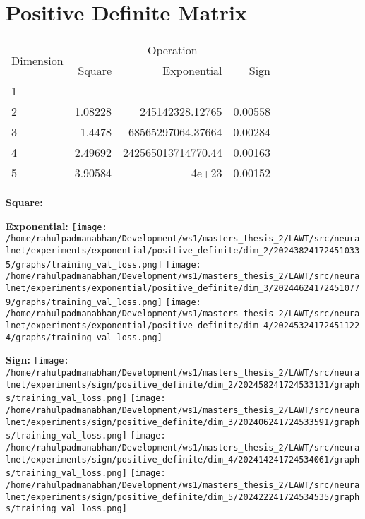 \documentclass{article}
\begin{document}
\pagebreak
\section{Positive Definite Matrix}
\begin{tabular}{@{}lrrr@{}}
\toprule
\multirow{2}{*}{Dimension} & \multicolumn{3}{c}{Operation} \\
\cmidrule(l){2-4}
& Square & Exponential & Sign \\
\midrule
1 & & & \\
2 & 1.08228 & 245142328.12765 & 0.00558 \\
3 & 1.4478 & 68565297064.37664 & 0.00284 \\
4 & 2.49692 & 242565013714770.44 & 0.00163 \\
5 & 3.90584 & 4e+23 & 0.00152 \\
\bottomrule
\end{tabular}

\textbf{Square:}

\textbf{Exponential:}
\texttt{[image: /home/rahulpadmanabhan/Development/ws1/masters\_thesis\_2/LAWT/src/neuralnet/experiments/exponential/positive\_definite/dim\_2/202438241724510335/graphs/training\_val\_loss.png]}
\texttt{[image: /home/rahulpadmanabhan/Development/ws1/masters\_thesis\_2/LAWT/src/neuralnet/experiments/exponential/positive\_definite/dim\_3/202446241724510779/graphs/training\_val\_loss.png]}
\texttt{[image: /home/rahulpadmanabhan/Development/ws1/masters\_thesis\_2/LAWT/src/neuralnet/experiments/exponential/positive\_definite/dim\_4/202453241724511224/graphs/training\_val\_loss.png]}

\textbf{Sign:}
\texttt{[image: /home/rahulpadmanabhan/Development/ws1/masters\_thesis\_2/LAWT/src/neuralnet/experiments/sign/positive\_definite/dim\_2/202458241724533131/graphs/training\_val\_loss.png]}
\texttt{[image: /home/rahulpadmanabhan/Development/ws1/masters\_thesis\_2/LAWT/src/neuralnet/experiments/sign/positive\_definite/dim\_3/202406241724533591/graphs/training\_val\_loss.png]}
\texttt{[image: /home/rahulpadmanabhan/Development/ws1/masters\_thesis\_2/LAWT/src/neuralnet/experiments/sign/positive\_definite/dim\_4/202414241724534061/graphs/training\_val\_loss.png]}
\texttt{[image: /home/rahulpadmanabhan/Development/ws1/masters\_thesis\_2/LAWT/src/neuralnet/experiments/sign/positive\_definite/dim\_5/202422241724534535/graphs/training\_val\_loss.png]}
\end{document}

